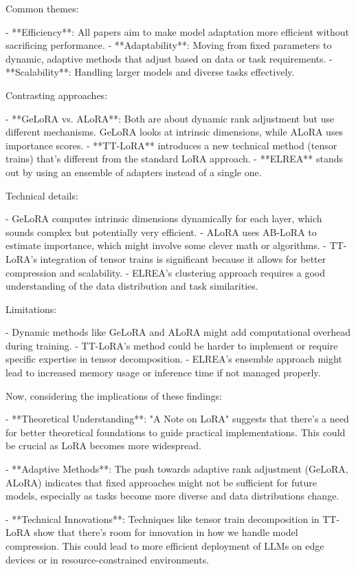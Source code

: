 \documentclass[conference]{IEEEtran}
\begin{document}
Common themes:

- **Efficiency**: All papers aim to make model adaptation more efficient without sacrificing performance.
- **Adaptability**: Moving from fixed parameters to dynamic, adaptive methods that adjust based on data or task requirements.
- **Scalability**: Handling larger models and diverse tasks effectively.

Contrasting approaches:

- **GeLoRA vs. ALoRA**: Both are about dynamic rank adjustment but use different mechanisms. GeLoRA looks at intrinsic dimensions, while ALoRA uses importance scores.
- **TT-LoRA** introduces a new technical method (tensor trains) that's different from the standard LoRA approach.
- **ELREA** stands out by using an ensemble of adapters instead of a single one.

Technical details:

- GeLoRA computes intrinsic dimensions dynamically for each layer, which sounds complex but potentially very efficient.
- ALoRA uses AB-LoRA to estimate importance, which might involve some clever math or algorithms.
- TT-LoRA's integration of tensor trains is significant because it allows for better compression and scalability.
- ELREA's clustering approach requires a good understanding of the data distribution and task similarities.

Limitations:

- Dynamic methods like GeLoRA and ALoRA might add computational overhead during training.
- TT-LoRA's method could be harder to implement or require specific expertise in tensor decomposition.
- ELREA's ensemble approach might lead to increased memory usage or inference time if not managed properly.

Now, considering the implications of these findings:

- **Theoretical Understanding**: "A Note on LoRA" suggests that there's a need for better theoretical foundations to guide practical implementations. This could be crucial as LoRA becomes more widespread.
  
- **Adaptive Methods**: The push towards adaptive rank adjustment (GeLoRA, ALoRA) indicates that fixed approaches might not be sufficient for future models, especially as tasks become more diverse and data distributions change.

- **Technical Innovations**: Techniques like tensor train decomposition in TT-LoRA show that there's room for innovation in how we handle model compression. This could lead to more efficient deployment of LLMs on edge devices or in resource-constrained environments.
\end{document}
